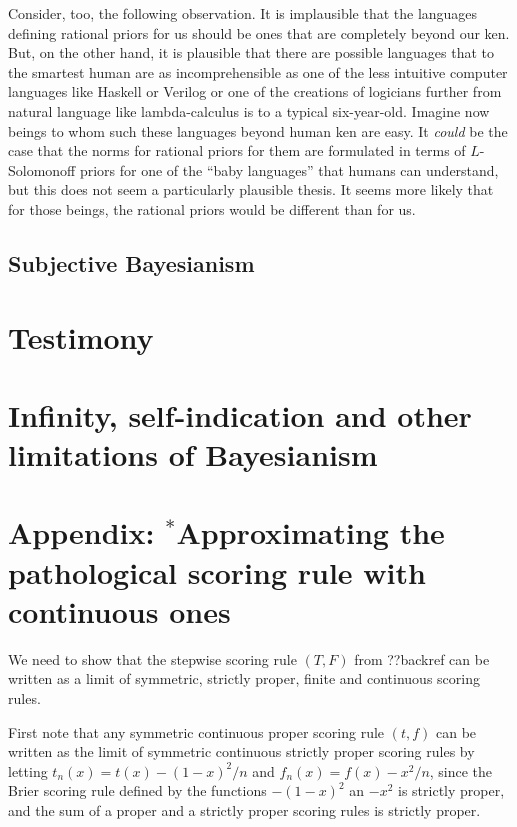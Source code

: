Consider, too, the following observation. It is implausible that the languages defining rational priors for us
should be ones that are completely beyond our ken. But, on the other hand, it is plausible that there are possible
languages that to the smartest human are as incomprehensible as one of the less intuitive computer languages like
Haskell or Verilog or one of the creations of logicians further from natural language like lambda-calculus is to a typical
six-year-old. Imagine now beings to whom such these languages beyond human ken are easy. It \textit{could} be the case that
the norms for rational priors for them are formulated in terms of $L$-Solomonoff priors for one of the ``baby languages''
that humans can understand, but this does not seem a particularly plausible thesis. It seems more likely that for those
beings, the rational priors would be different than for us. 

\subsection{Subjective Bayesianism}






\section{Testimony}
\section{Infinity, self-indication and other limitations of Bayesianism}

\section*{Appendix: $^*$Approximating the pathological scoring rule with continuous ones}
We need to show that the stepwise scoring rule $(T,F)$ from ??backref can be written as a limit of
symmetric, strictly proper, finite and continuous scoring rules. 

First note that any symmetric continuous proper scoring rule $(t,f)$ can be written as the limit of symmetric continuous
strictly proper scoring rules by letting $t_n(x)=t(x)-(1-x)^2/n$ and $f_n(x)=f(x)-x^2/n$, since the Brier scoring rule defined
by the functions $-(1-x)^2$ an $-x^2$ is strictly proper, and the sum of a proper and a strictly proper scoring rules is
strictly proper. 

